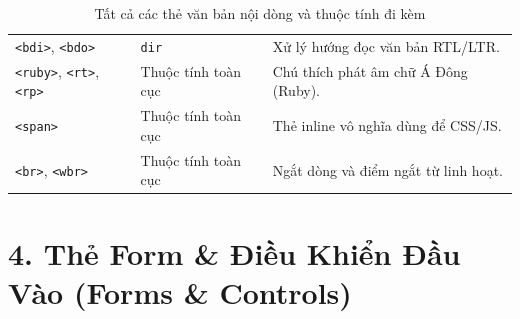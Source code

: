 \documentclass[11pt,oneside]{book}
\newcommand{\codeinline}[1]{\textcolor{accentOrange}{\texttt{#1}}}
\begin{document}
\begin{table}[H]
\begin{prettyTableBox}
\begin{tabularx}{\linewidth}{lp{3.5cm}X}
\codeinline{<bdi>}, \codeinline{<bdo>} & \codeinline{dir} & Xử lý hướng đọc văn bản RTL/LTR. \\
\codeinline{<ruby>}, \codeinline{<rt>}, \codeinline{<rp>} & Thuộc tính toàn cục & Chú thích phát âm chữ Á Đông (Ruby). \\
\codeinline{<span>} & Thuộc tính toàn cục & Thẻ inline vô nghĩa dùng để CSS/JS. \\
\codeinline{<br>}, \codeinline{<wbr>} & Thuộc tính toàn cục & Ngắt dòng và điểm ngắt từ linh hoạt. \\
\end{tabularx}
\end{prettyTableBox}
\vspace{-2pt}
\caption{Tất cả các thẻ văn bản nội dòng và thuộc tính đi kèm}
\end{table}

\section{4. Thẻ Form \& Điều Khiển Đầu Vào (Forms \& Controls)}
\end{document}
